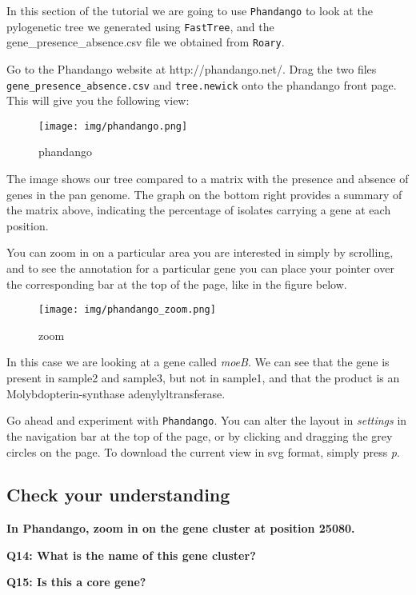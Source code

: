 \documentclass[11pt]{article}
\begin{document}
In this section of the tutorial we are going to use \texttt{Phandango}
to look at the pylogenetic tree we generated using \texttt{FastTree},
and the gene\_presence\_absence.csv file we obtained from
\texttt{Roary}.

Go to the Phandango website at http://phandango.net/. Drag the two files
\texttt{gene\_presence\_absence.csv} and \texttt{tree.newick} onto the
phandango front page. This will give you the following view:

    \begin{figure}
\centering
\texttt{[image: img/phandango.png]}
\caption{phandango}
\end{figure}

    The image shows our tree compared to a matrix with the presence and
absence of genes in the pan genome. The graph on the bottom right
provides a summary of the matrix above, indicating the percentage of
isolates carrying a gene at each position.

You can zoom in on a particular area you are interested in simply by
scrolling, and to see the annotation for a particular gene you can place
your pointer over the corresponding bar at the top of the page, like in
the figure below.

    \begin{figure}
\centering
\texttt{[image: img/phandango\_zoom.png]}
\caption{zoom}
\end{figure}

    In this case we are looking at a gene called \textit{moeB}. We can see
that the gene is present in sample2 and sample3, but not in sample1, and
that the product is an Molybdopterin-synthase adenylyltransferase.

Go ahead and experiment with \texttt{Phandango}. You can alter the
layout in \textit{settings} in the navigation bar at the top of the page,
or by clicking and dragging the grey circles on the page. To download
the current view in svg format, simply press \textit{p}.

    \hypertarget{check-your-understanding}{%
\subsection{Check your understanding}\label{check-your-understanding}}

\textbf{In Phandango, zoom in on the gene cluster at position 25080.}

\textbf{Q14: What is the name of this gene cluster?}

\textbf{Q15: Is this a core gene?}
\end{document}
